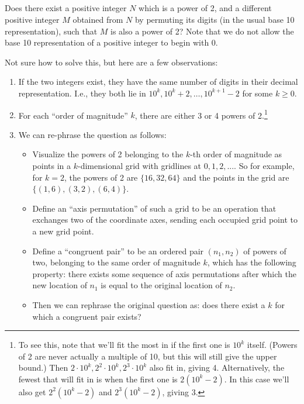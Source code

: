 \documentclass[12pt]{article}
\begin{document}
\newpage
\subsection{}
Does there exist a positive integer $N$ which is a power of 2, and a different
positive integer $M$ obtained from $N$ by permuting its digits (in the usual
base 10 representation), such that $M$ is also a power of 2? Note that we do
not allow the base 10 representation of a positive integer to begin with 0.

\begin{mdframed}
  Not sure how to solve this, but here are a few observations:
  \begin{enumerate}
  \item If the two integers exist, they have the same number of digits in their
    decimal representation. I.e., they both lie in
    ${10^k,10^k + 2, \ldots, 10^{k+1} - 2}$ for some $k \geq 0$.
  \item For each ``order of magnitude'' $k$, there are either 3 or 4 powers of
    2.\footnote{To see this, note that we'll fit the most in if the first one
      is $10^k$ itself. (Powers of 2 are never actually a multiple of 10, but
      this will still give the upper bound.) Then
      $2\cdot 10^k, 2^2\cdot 10^k,2^3\cdot 10^k$ also fit in, giving
      4. Alternatively, the fewest that will fit in is when the first one is
      $2(10^k - 2)$. In this case we'll also get $2^2(10^k - 2)$ and
      $2^3(10^k - 2)$, giving 3.}
  \item We can re-phrase the question as follows:
    \begin{itemize}
    \item Visualize the powers of 2 belonging to the $k$-th order
      of magnitude as points in a $k$-dimensional grid with gridlines at
      $0, 1, 2, ...$. So for example, for $k=2$, the powers of 2 are
      $\{16, 32, 64\}$ and the points in the grid are
      $\{(1,6), (3,2), (6,4)\}$.
    \item Define an ``axis permutation'' of such a grid to be an operation that
      exchanges two of the coordinate axes, sending each occupied grid point to a
      new grid point.
    \item Define a ``congruent pair'' to be an ordered pair $(n_1, n_2)$ of
      powers of two, belonging to the same order of magnitude $k$, which has
      the following property: there exists some sequence of axis permutations
      after which the new location of $n_1$ is equal to the original location
      of $n_2$.
    \item Then we can rephrase the original question as: does there exist a $k$
      for which a congruent pair exists?
    \end{itemize}
  \end{enumerate}


\end{mdframed}
\end{document}
